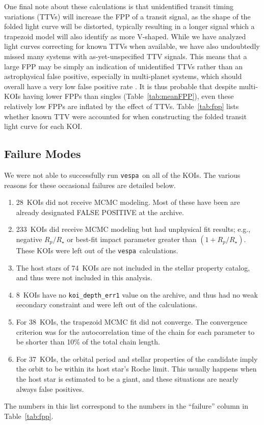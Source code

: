 \documentclass{emulateapj}
\newcommand{\Tab}[1]{Table~\ref{tab:#1}}
\newcommand{\tab}[1]{\Tab{#1}}
\newcommand{\sectlabel}[1]{\label{sect:#1}}
\newcommand{\nbadphot}{28} %
\newcommand{\nbadrowemcmc}{233}
\newcommand{\nbadstellar}{74} %
\newcommand{\nbadsec}{8} %
\newcommand{\nbadtrapfit}{38} %
\newcommand{\nbadroche}{37}
\newcommand{\vespa}{\texttt{vespa}}
\begin{document}
One final note about these calculations is that unidentified transit
timing variations (TTVs) will increase the FPP of a transit signal, as
the shape of the folded light curve will be distorted, typically
resulting in a longer signal which a trapezoid model will also
identify as more V-shaped.  While we have analyzed light curves
correcting for known TTVs when available, we have also undoubtedly
missed many systems with as-yet-unspecified TTV signals.  This means
that a large FPP may be simply an indication of unidentified TTVs
rather than an astrophysical false positive, especially in  
multi-planet systems, which should overall have a very low false positive
rate \citep{Lissauer:2014,Rowe:2014}.  It is thus probable that
despite multi-KOIs having lower FPPs than singles (\tab{meanFPP}),
even these relatively low FPPs are inflated by the effect of TTVs.
\Tab{fpp} lists whether known TTV were accounted for when constructing
the folded transit light curve for each KOI.


\subsection{Failure Modes}
\sectlabel{failures}


We were not able to successfully run \vespa\ on all of the KOIs. The 
various reasons for these occasional failures are detailed below.  
\begin{enumerate}
\item \nbadphot\ KOIs did not receive MCMC modeling.  Most of these
  have been are already designated FALSE POSITIVE at the archive.
\item \nbadrowemcmc\ KOIs did receive MCMC modeling but had unphysical fit
  results; e.g., negative $R_p/R_\star$ or best-fit impact parameter
  greater than $(1 + R_p/R_\star)$.  These KOIs were left out of the \vespa\ calculations.
\item The host stars of \nbadstellar\ KOIs are not included in the
   stellar property catalog, and thus were not
  included in this analysis.
\item \nbadsec\ KOIs have no \verb|koi_depth_err1| value on the archive,
  and thus had no weak secondary constraint and were left out of the
  calculations.
\item For \nbadtrapfit\ KOIs, the trapezoid MCMC fit did not converge.  The
  convergence criterion was for the autocorrelation time of the chain
  for each parameter to be shorter than 10\% of the total chain
  length.
\item For \nbadroche\ KOIs, the orbital period and stellar properties of the 
  candidate imply the orbit to be within its host star's Roche limit.  This
  usually happens when the host star is estimated to be a giant, and
  these situations are nearly always false positives. 
\end{enumerate}
The numbers in this list correspond to the numbers in
the ``failure'' column in \tab{fpp}.  
\end{document}
